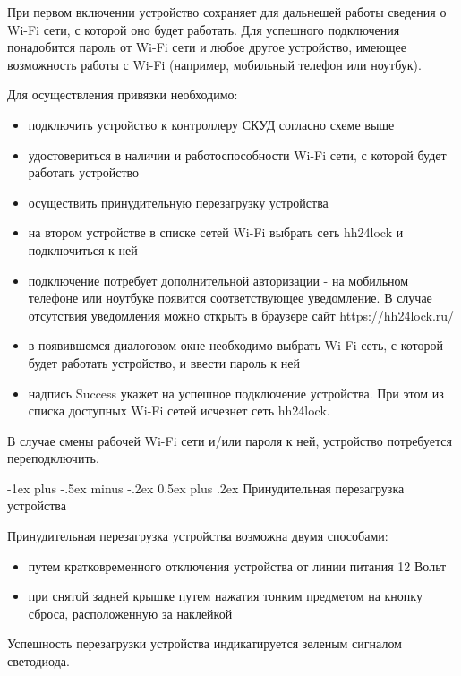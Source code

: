 \documentclass[a4paper,10pt,landscape]{article}
\makeatletter
\renewcommand{\section}{\@startsection{section}{1}{0mm}%
                                {-1ex plus -.5ex minus -.2ex}%
                                {0.5ex plus .2ex}%
                                {\normalfont\large\bfseries}}
\makeatother
\begin{document}
\begin{multicols}{3}
При первом включении устройство сохраняет для дальнешей работы сведения о Wi-Fi сети, с которой оно будет работать. Для успешного подключения понадобится пароль от Wi-Fi сети и любое другое устройство, имеющее возможность работы с Wi-Fi (например, мобильный телефон или ноутбук).

Для осуществления привязки необходимо:

\begin{itemize}
  \item подключить устройство к контроллеру СКУД согласно схеме выше 
  \item удостовериться в наличии и работоспособности Wi-Fi сети, с которой будет работать устройство
  \item осуществить принудительную перезагрузку устройства 
  \item на втором устройстве в списке сетей Wi-Fi выбрать сеть hh24lock и подключиться к ней
  \item подключение потребует дополнительной авторизации - на мобильном телефоне или ноутбуке появится соответствующее уведомление. В случае отсутствия уведомления можно открыть в браузере сайт https://hh24lock.ru/ 
  \item в появившемся диалоговом окне необходимо выбрать Wi-Fi сеть, с которой будет работать устройство, и ввести пароль к ней
  \item надпись Success укажет на успешное подключение устройства. При этом из списка доступных Wi-Fi сетей исчезнет сеть hh24lock.
\end{itemize}

В случае смены рабочей Wi-Fi сети и/или пароля к ней, устройство потребуется переподключить. 

\section{Принудительная перезагрузка устройства}

Принудительная перезагрузка устройства возможна двумя способами:  

\begin{itemize} 
  \item путем кратковременного отключения устройства от линии питания 12 Вольт
  \item при снятой задней крышке путем нажатия тонким предметом на кнопку сброса, расположенную за наклейкой
\end{itemize}

Успешность перезагрузки устройства индикатируется зеленым сигналом светодиода. 


\end{multicols}
\end{document}
